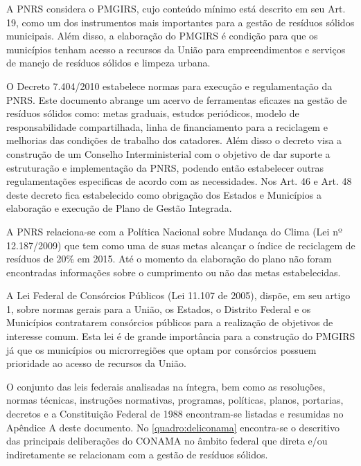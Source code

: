 	A PNRS considera o PMGIRS, cujo conteúdo mínimo está descrito em seu Art. 19, como um dos instrumentos mais importantes para a gestão de resíduos sólidos municipais. Além disso, a elaboração do PMGIRS é condição para que os municípios tenham acesso a recursos da União para empreendimentos e serviços de manejo de resíduos sólidos e limpeza urbana.
	 
	O Decreto 7.404/2010 estabelece normas para execução e regulamentação da PNRS. Este documento abrange um acervo de ferramentas eficazes na gestão de resíduos sólidos como: metas graduais, estudos periódicos, modelo de responsabilidade compartilhada, linha de financiamento para a reciclagem e melhorias das condições de trabalho dos catadores. Além disso o decreto visa a construção de um Conselho Interministerial com o objetivo de dar suporte a estruturação e implementação da PNRS, podendo então estabelecer outras regulamentações especificas de acordo com as necessidades. Nos Art. 46 e Art. 48 deste decreto fica estabelecido como obrigação dos Estados e Municípios a elaboração e execução de Plano de Gestão Integrada.
	
	A PNRS relaciona-se com a Política Nacional sobre Mudança do Clima (Lei nº 12.187/2009) que tem como uma de suas metas alcançar o índice de reciclagem de resíduos de 20\% em 2015. Até o momento da elaboração do plano não foram encontradas informações sobre o cumprimento ou não das metas estabelecidas.  
	
	A Lei Federal de Consórcios Públicos (Lei 11.107 de 2005), dispõe, em seu artigo 1, sobre normas gerais para a União, os Estados, o Distrito Federal e os Municípios contratarem consórcios públicos para a realização de objetivos de interesse comum. Esta lei é de grande importância para a construção do PMGIRS já que os municípios ou microrregiões que optam por consórcios possuem prioridade ao acesso de recursos da União.
	
	O conjunto das leis federais analisadas na íntegra, bem como as resoluções, normas técnicas, instruções normativas, programas, políticas, planos, portarias, decretos e a Constituição Federal de 1988 encontram-se listadas e resumidas no Apêndice A deste documento. 
	No \autoref{quadro:deliconama} encontra-se o descritivo das principais deliberações do CONAMA no âmbito federal que direta e/ou indiretamente se relacionam com a gestão de resíduos sólidos.
	
